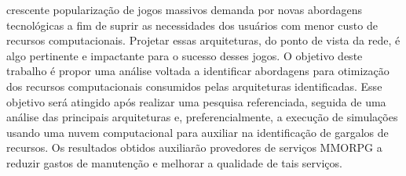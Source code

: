 crescente popularização de jogos massivos demanda por novas abordagens tecnológicas a fim de suprir as necessidades dos usuários com menor custo de recursos computacionais.
%
Projetar essas arquiteturas, do ponto de vista da rede, é algo pertinente e impactante para o sucesso desses jogos.
%
O objetivo deste trabalho é propor uma análise voltada a identificar abordagens para otimização dos recursos computacionais consumidos pelas arquiteturas identificadas.
%
Esse objetivo será atingido após realizar uma pesquisa referenciada, seguida de uma análise das principais arquiteturas e, preferencialmente, a execução de simulações usando uma nuvem computacional para auxiliar na identificação de gargalos de recursos. Os resultados obtidos auxiliarão provedores de serviços \ac{MMORPG} a reduzir gastos de manutenção e melhorar a qualidade de tais serviços.
